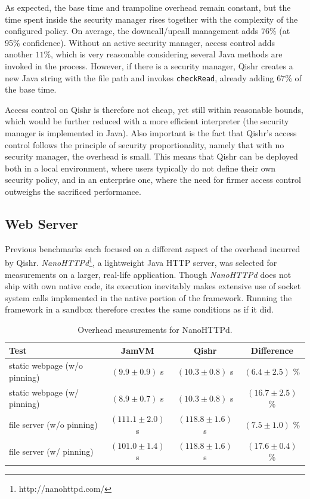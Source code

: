 \documentclass[a4paper,12pt,twoside,openright]{report}
\begin{document}
As expected, the base time and trampoline overhead remain constant, but the time spent inside the security manager rises together with the complexity of the configured policy. On average, the downcall/upcall management adds $76\%$ (at 95\% confidence). Without an active security manager, access control adds another $11\%$, which is very reasonable considering several Java methods are invoked in the process. However, if there is a security manager, Qishr creates a new Java string with the file path and invokes \texttt{checkRead}, already adding $67\%$ of the base time. 

Access control on Qishr is therefore not cheap, yet still within reasonable bounds, which would be further reduced with a more efficient interpreter (the security manager is implemented in Java). Also important is the fact that Qishr's access control follows the principle of security proportionality, namely that with no security manager, the overhead is small. This means that Qishr can be deployed both in a local environment, where users typically do not define their own security policy, and in an enterprise one, where the need for firmer access control outweighs the sacrificed performance. 

\subsection{Web Server}

Previous benchmarks each focused on a different aspect of the overhead incurred by Qishr. \emph{NanoHTTPd}\footnote{http://nanohttpd.com/}, a lightweight Java HTTP server, was selected for measurements on a larger, real-life application. Though \emph{NanoHTTPd} does not ship with own native code, its execution inevitably makes extensive use of socket system calls implemented in the native portion of the framework. Running the framework in a sandbox therefore creates the same conditions as if it did.

\begin{table}[t]
	\centering
	\scriptsize
	\begin{tabular}{|l|c|c|c|}
		\hline
		\bf Test			& \bf JamVM		& \bf Qishr		& \bf Difference \\
		\hline
		static webpage (w/o pinning)	& $(9.9 \pm 0.9)$ s	& $(10.3 \pm 0.8)$ s	& $(6.4 \pm 2.5)$ \% \\
		static webpage (w/ pinning)	& $(8.9 \pm 0.7)$ s	& $(10.3 \pm 0.8)$ s 	& $(16.7 \pm 2.5)$ \% \\
		file server (w/o pinning)	& $(111.1 \pm 2.0)$ s	& $(118.8 \pm 1.6)$ s 	& $(7.5 \pm 1.0)$ \% \\
		file server (w/ pinning)	& $(101.0 \pm 1.4)$ s	& $(118.8 \pm 1.6)$ s 	& $(17.6 \pm 0.4)$ \% \\
		\hline
	\end{tabular}
	\caption{Overhead measurements for NanoHTTPd.}
	\label{table:OverheadNanoHTTPd}
\end{table}
\end{document}
